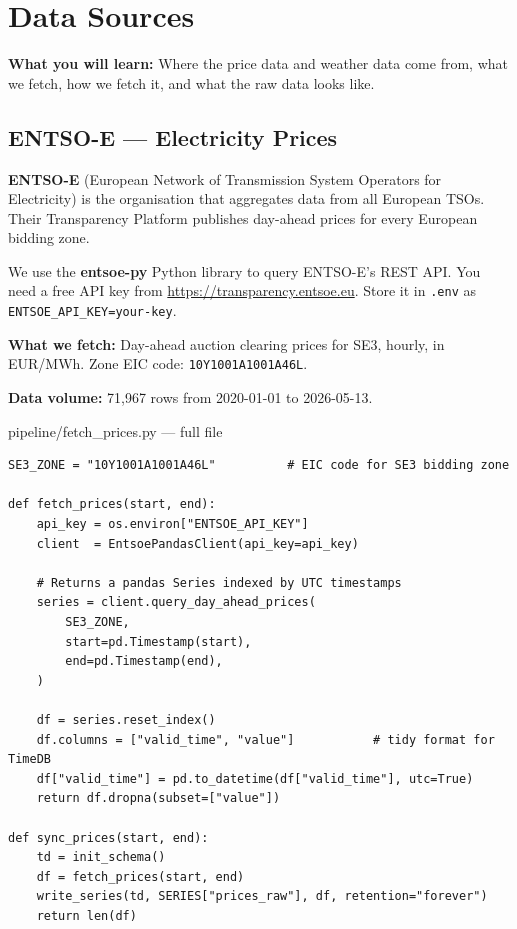 \documentclass[12pt, a4paper, oneside]{memoir}
\newcommand{\code}[1]{\texttt{\footnotesize #1}}
\begin{document}
\chapter{Data Sources}\label{ch:data}

\begin{chapterintro}
\sffamily\small\textbf{What you will learn:} Where the price data and weather data
come from, what we fetch, how we fetch it, and what the raw data looks like.
\end{chapterintro}

\section{ENTSO-E --- Electricity Prices}

\textbf{ENTSO-E} (European Network of Transmission System Operators for Electricity) is
the organisation that aggregates data from all European TSOs. Their Transparency Platform
publishes day-ahead prices for every European bidding zone.

\begin{keyidea}
We use the \textbf{entsoe-py} Python library to query ENTSO-E's REST API.
You need a free API key from \url{https://transparency.entsoe.eu}.
Store it in \code{.env} as \code{ENTSOE\_API\_KEY=your-key}.
\end{keyidea}

\textbf{What we fetch:} Day-ahead auction clearing prices for SE3, hourly, in EUR/MWh.
Zone EIC code: \code{10Y1001A1001A46L}.

\textbf{Data volume:} 71,967 rows from 2020-01-01 to 2026-05-13.

\begin{codefile}{pipeline/fetch\_prices.py --- full file}
\footnotesize
\begin{verbatim}
SE3_ZONE = "10Y1001A1001A46L"          # EIC code for SE3 bidding zone

def fetch_prices(start, end):
    api_key = os.environ["ENTSOE_API_KEY"]
    client  = EntsoePandasClient(api_key=api_key)

    # Returns a pandas Series indexed by UTC timestamps
    series = client.query_day_ahead_prices(
        SE3_ZONE,
        start=pd.Timestamp(start),
        end=pd.Timestamp(end),
    )

    df = series.reset_index()
    df.columns = ["valid_time", "value"]           # tidy format for TimeDB
    df["valid_time"] = pd.to_datetime(df["valid_time"], utc=True)
    return df.dropna(subset=["value"])

def sync_prices(start, end):
    td = init_schema()
    df = fetch_prices(start, end)
    write_series(td, SERIES["prices_raw"], df, retention="forever")
    return len(df)
\end{verbatim}
\end{codefile}
\end{document}
